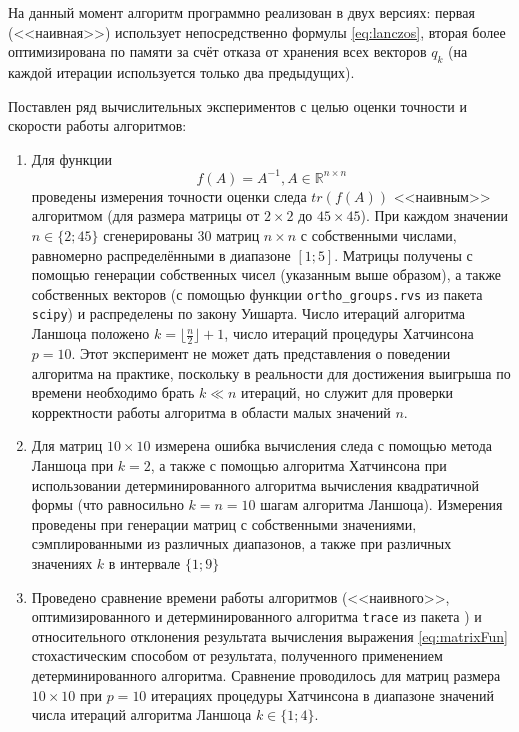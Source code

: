 На данный момент алгоритм программно реализован в двух версиях: первая (<<наивная>>) использует непосредственно формулы \eqref{eq:lanczos}, вторая более оптимизирована по памяти за счёт отказа от хранения всех векторов $ q_k $ (на каждой итерации используется только два предыдущих).

Поставлен ряд вычислительных экспериментов с целью оценки точности и скорости работы алгоритмов:

\begin{enumerate}
    \item Для функции
    \begin{equation}\label{eq:matrixFun}
        f(A) = A^{-1}, A \in \mathds{R}^{n \times n}
    \end{equation}
    проведены измерения точности оценки следа $tr(f(A))$ <<наивным>> алгоритмом (для размера матрицы от $ 2 \times 2 $ до $ 45 \times 45 $).
    При каждом значении $ n \in \{ 2;45 \} $ сгенерированы $ 30 $ матриц $ n \times n $ с собственными числами, равномерно распределёнными в диапазоне $ [1; 5] $.
    Матрицы получены с помощью генерации собственных чисел (указанным выше образом), а также собственных векторов (с помощью функции \texttt{ortho\_groups.rvs} \cite{mezzadri2007generate} из пакета \texttt{scipy}) и распределены по закону Уишарта.
    Число итераций алгоритма Ланшоца положено $ k = \lfloor \frac{n}{2} \rfloor + 1 $, число итераций процедуры Хатчинсона $ p = 10 $.
    Этот эксперимент не может дать представления о поведении алгоритма на практике, поскольку в реальности для достижения выигрыша по времени необходимо брать $ k \ll n $ итераций, но служит для проверки корректности работы алгоритма в области малых значений $ n $. %

    \item Для матриц $ 10 \times 10 $ измерена ошибка вычисления следа с помощью метода Ланшоца при $ k=2 $, а также с помощью алгоритма Хатчинсона при использовании детерминированного алгоритма вычисления квадратичной формы (что равносильно $k=n=10$ шагам алгоритма Ланшоца).
    Измерения проведены при генерации матриц с собственными значениями, сэмплированными из различных диапазонов, а также при различных значениях $ k $ в интервале $ \{ 1;9 \} $

    \item Проведено сравнение времени работы алгоритмов (<<наивного>>, оптимизированного и детерминированного алгоритма \texttt{trace} из пакета ) и относительного отклонения результата вычисления выражения \eqref{eq:matrixFun} стохастическим способом от результата, полученного применением детерминированного алгоритма.
    Сравнение проводилось для матриц размера $ 10 \times 10 $ при $ p = 10 $ итерациях процедуры Хатчинсона в диапазоне значений числа итераций алгоритма Ланшоца $ k \in \{1; 4\} $.

\end{enumerate}

